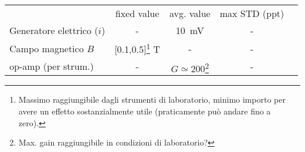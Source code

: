     \begin{tabular}{lcccc}
        \toprule
        & fixed value & avg. value & max STD (ppt)\\
        \colrule
        Generatore elettrico ($i$) & - & \SI{10}{\milli\volt} & - \\
        Campo magnetico $B$ & [0.1,0.5]\footnote{Massimo raggiungibile dagli strumenti di laboratorio, minimo importo per avere un effetto sostanzialmente utile (praticamente può andare fino a zero).} \si{\tesla} & - & - \\
        op-amp (per strum.) & - & $G\simeq 200$\footnote{Max. gain raggiungibile in condizioni di laboratorio?} & - \\
        \toprule
    \end{tabular}
